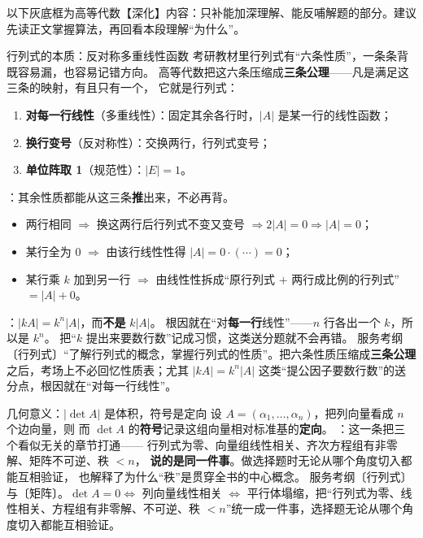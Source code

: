 

以下灰底框为高等代数【深化】内容：只补能加深理解、能反哺解题的部分。建议先读正文掌握算法，再回看本段理解“为什么”。

\begin{fdeep}{行列式的本质：反对称多重线性函数}
考研教材里行列式有“六条性质”，一条条背既容易漏，也容易记错方向。
高等代数把这六条压缩成\textbf{三条公理}——凡是满足这三条的映射，有且只有一个，
它就是行列式：
\begin{enumerate}[leftmargin=2.2em,itemsep=0.2em]
\item \textbf{对每一行线性}（多重线性）：固定其余各行时，$|A|$ 是某一行的线性函数；
\item \textbf{换行变号}（反对称性）：交换两行，行列式变号；
\item \textbf{单位阵取 1}（规范性）：$|E|=1$。
\end{enumerate}
\fbref{}：其余性质都能从这三条\textbf{推}出来，不必再背。
\begin{itemize}[leftmargin=2.2em,itemsep=0.2em]
\item 两行相同 $\Rightarrow$ 换这两行后行列式不变又变号 $\Rightarrow 2|A|=0\Rightarrow|A|=0$；
\item 某行全为 $0$ $\Rightarrow$ 由该行线性性得 $|A|=0\cdot(\cdots)=0$；
\item 某行乘 $k$ 加到另一行 $\Rightarrow$ 由线性性拆成“原行列式 $+$ 两行成比例的行列式”$=|A|+0$。
\end{itemize}
：$|kA|=k^{n}|A|$，而\textbf{不是} $k|A|$。
根因就在“对\textbf{每一行}线性”——$n$ 行各出一个 $k$，所以是 $k^{n}$。
把“$k$ 提出来要数行数”记成习惯，这类送分题就不会再错。
\fbref{}服务考纲〔行列式〕“了解行列式的概念，掌握行列式的性质”。把六条性质压缩成\textbf{三条公理}之后，考场上不必回忆性质表；尤其 $|kA|=k^{n}|A|$ 这类“提公因子要数行数”的送分点，根因就在“对每一行线性”。
\end{fdeep}

\begin{fdeep}{几何意义：$|\det A|$ 是体积，符号是定向}
设 $A=(\alpha_1,\dots,\alpha_n)$，把列向量看成 $n$ 个边向量，则
而 $\det A$ 的\textbf{符号}记录这组向量相对标准基的\textbf{定向}。
\fbref{}：这一条把三个看似无关的章节打通——
行列式为零、向量组线性相关、齐次方程组有非零解、矩阵不可逆、秩 $<n$，
\textbf{说的是同一件事}。做选择题时无论从哪个角度切入都能互相验证，
也解释了为什么“秩”是贯穿全书的中心概念。
\fbref{}服务考纲〔行列式〕与〔矩阵〕。$\det A=0\iff$ 列向量线性相关 $\iff$ 平行体塌缩，把“行列式为零、线性相关、方程组有非零解、不可逆、秩 $<n$”统一成一件事，选择题无论从哪个角度切入都能互相验证。
\end{fdeep}

